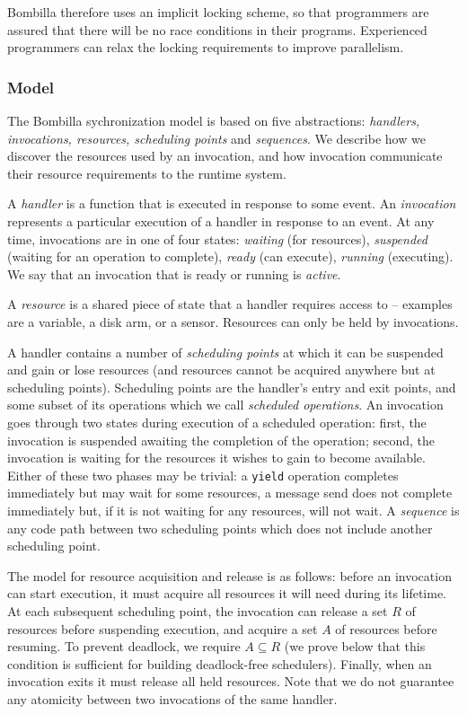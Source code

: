 \documentclass[10pt]{article}
\newcommand{\bomb}{Bombilla\xspace}
\begin{document}
\bomb therefore uses an implicit locking scheme, so that
programmers are assured that there will be no race conditions in their
programs. Experienced programmers can relax the locking requirements
to improve parallelism.

\subsubsection{Model}

The \bomb sychronization model is based on five abstractions:
\emph{handlers, invocations, resources, scheduling points} and
\emph{sequences}. We describe how we discover the resources used by an
invocation, and how invocation communicate their resource requirements
to the runtime system.

A \emph{handler} is a function that is executed in response to some
event. An \emph{invocation} represents a particular execution of a
handler in response to an event. At any time, invocations are in one
of four states: \emph{waiting} (for resources), \emph{suspended}
(waiting for an operation to complete), \emph{ready} (can execute),
\emph{running} (executing). We say that an invocation that is ready or
running is \emph{active}.

A \emph{resource} is a shared piece of state that a handler requires
access to -- examples are a variable, a disk arm, or a sensor.
Resources can only be held by invocations.

A handler contains a number of \emph{scheduling points} at which it can be
suspended and gain or lose resources (and resources cannot be acquired
anywhere but at scheduling points). Scheduling points are the handler's
entry and exit points, and some subset of its operations which we call
\emph{scheduled operations}. An invocation goes through two states during
execution of a scheduled operation: first, the invocation is suspended
awaiting the completion of the operation; second, the invocation is
waiting for the resources it wishes to gain to become
available. Either of these two phases may be trivial: a {\tt yield}
operation completes immediately but may wait for some resources, a
message send does not complete immediately but, if it is not waiting
for any resources, will not wait. A \emph{sequence} is any code path
between two scheduling points which does not include another
scheduling point.

The model for resource acquisition and release is as follows: before
an invocation can start execution, it must acquire all resources it
will need during its lifetime. At each subsequent scheduling point,
the invocation can release a set $R$ of resources before suspending
execution, and acquire a set $A$ of resources before resuming. To
prevent deadlock, we require $A
\subseteq R$ (we prove below that this condition is sufficient for building
deadlock-free schedulers). Finally, when an invocation exits it must
release all held resources. Note that we do not guarantee any atomicity
between two invocations of the same handler.
\end{document}
